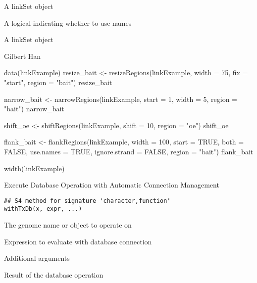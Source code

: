 \documentclass[letterpaper]{book}
\begin{document}
%
\begin{Arguments}
\begin{ldescription}
\item[\code{x}] A linkSet object

\item[\code{use.names}] A logical indicating whether to use names
\end{ldescription}
\end{Arguments}
%
\begin{Value}
A linkSet object
\end{Value}
%
\begin{Author}
Gilbert Han
\end{Author}
%
\begin{Examples}
\begin{ExampleCode}
data(linkExample)
resize_bait <- resizeRegions(linkExample, width = 75, fix = "start", region = "bait")
resize_bait

narrow_bait <- narrowRegions(linkExample, start = 1, width = 5, region = "bait")
narrow_bait

shift_oe <- shiftRegions(linkExample, shift = 10, region = "oe")
shift_oe

flank_bait <- flankRegions(linkExample, width = 100, start = TRUE, both = FALSE, use.names = TRUE, ignore.strand = FALSE, region = "bait")
flank_bait

width(linkExample)

\end{ExampleCode}
\end{Examples}
%
\begin{Description}
Execute Database Operation with Automatic Connection Management
\end{Description}
%
\begin{Usage}
\begin{verbatim}
## S4 method for signature 'character,function'
withTxDb(x, expr, ...)
\end{verbatim}
\end{Usage}
%
\begin{Arguments}
\begin{ldescription}
\item[\code{x}] The genome name or object to operate on

\item[\code{expr}] Expression to evaluate with database connection

\item[\code{...}] Additional arguments
\end{ldescription}
\end{Arguments}
%
\begin{Value}
Result of the database operation
\end{Value}
\printindex{}
\end{document}
